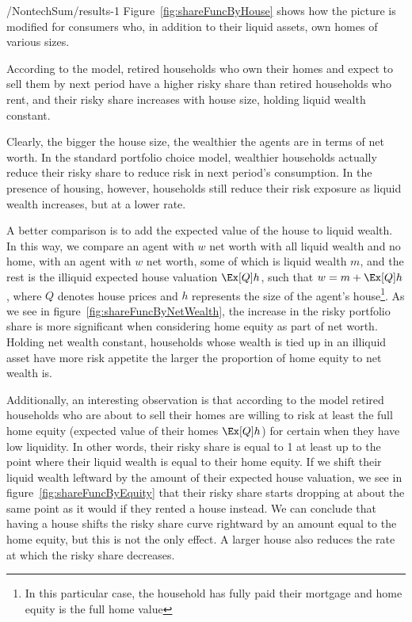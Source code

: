 \documentclass[PortfolioChoiceWithRiskyHousing]{subfiles}
\begin{document}
\begin{verbatimwrite}{\LaTeXOutput/NontechSum/results-1}
Figure~\ref{fig:shareFuncByHouse} shows how the picture is modified for consumers who, in addition to their liquid assets, own homes of various sizes.

According to the model, retired households who own their homes and expect to sell them by next period have a higher risky share than retired households who rent, and their risky share increases with house size, holding liquid wealth constant.

Clearly, the bigger the house size, the wealthier the agents are in terms of net worth. In the standard portfolio choice model, wealthier households actually reduce their risky share to reduce risk in next period's consumption. In the presence of housing, however, households still reduce their risk exposure as liquid wealth increases, but at a lower rate.

A better comparison is to add the expected value of the house to liquid wealth. In this way, we compare an agent with $w$ net worth with all liquid wealth and no home, with an agent with $w$ net worth, some of which is liquid wealth $m$, and the rest is the illiquid expected house valuation $\Ex[Q]h$,  such that $w = m + \Ex[Q]h$, where $Q$ denotes house prices and $h$ represents the size of the agent's house\footnote{In this particular case, the household has fully paid their mortgage and home equity is the full home value}. As we see in figure~\ref{fig:shareFuncByNetWealth}, the increase in the risky portfolio share is more significant when considering home equity as part of net worth. Holding net wealth constant, households whose wealth is tied up in an illiquid asset have more risk appetite the larger the proportion of home equity to net wealth is.

\renewcommand{\figName}{shareFuncByNetWealth}
\renewcommand{\figFile}{\figName}

\end{verbatimwrite}


Additionally, an interesting observation is that according to the model retired households who are about to sell their homes are willing to risk at least the full home equity (expected value of their homes $\Ex[Q]h$) for certain when they have low liquidity. In other words, their risky share is equal to 1 at least up to the point where their liquid wealth is equal to their home equity. If we shift their liquid wealth leftward by the amount of their expected house valuation, we see in figure~\ref{fig:shareFuncByEquity} that their risky share starts dropping at about the same point as it would if they rented a house instead. We can conclude that having a house shifts the risky share curve rightward by an amount equal to the home equity, but this is not the only effect. A larger house also reduces the rate at which the risky share decreases.
\end{document}
